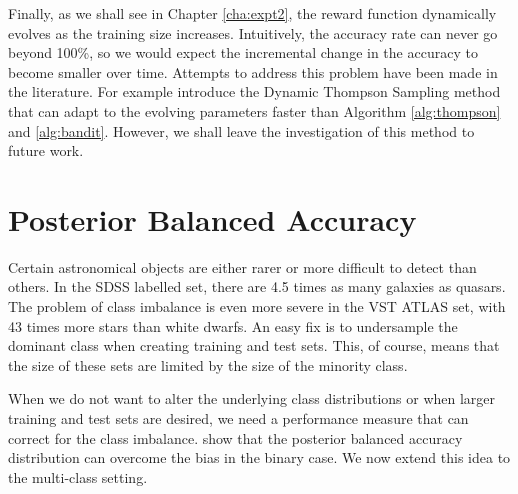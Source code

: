 Finally, as we shall see in Chapter \ref{cha:expt2}, the reward function 
dynamically evolves as the training size increases. Intuitively, the accuracy rate can never go
beyond 100\%, so we would expect the incremental change in the accuracy to become smaller over
time. Attempts to address this problem have been made in the literature. For example
 introduce the Dynamic Thompson Sampling method that can adapt to the evolving
parameters faster than Algorithm \ref{alg:thompson} and \ref{alg:bandit}. However, we shall leave
the investigation of this method to future work.


\section{Posterior Balanced Accuracy}   
\label{sec:measures}

Certain astronomical objects are either rarer or more difficult to detect than others. In the SDSS
labelled set, there are 4.5 times as many galaxies as quasars. The problem of class imbalance is
even more severe in the VST ATLAS set, with 43 times more stars than white dwarfs. An easy fix is
to undersample the dominant class when creating training and test sets. This, of course, means that
the size of these sets are limited by the size of the minority class.

When we do not want to alter the underlying class distributions or when larger training and test
sets are desired, we need a performance measure that can correct for the class imbalance.
 show that the posterior balanced accuracy distribution can overcome the
bias in the binary case. We now extend this idea to the multi-class setting.


